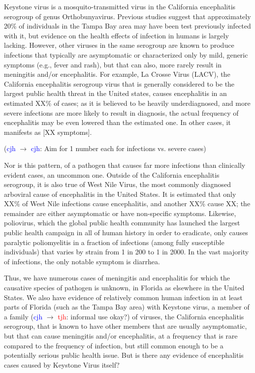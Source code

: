 \documentclass[12pt]{article}
\newcommand{\cjh}{\textcolor{blue}{cjh}}
\newcommand{\tjh}{\textcolor{red}{tjh}}
\newcommand{\msg}[3]{(#1 $\rightarrow$ #2: #3)}
\newcommand{\mcc}[1]{\msg\cjh\cjh{#1}}
\newcommand{\mct}[1]{\msg\cjh\tjh{#1}}
\begin{document}
        Keystone virus is a mosquito-transmitted virus in the California encephalitis serogroup of genus Orthobunyavirus. Previous studies suggest that approximately 20\% of individuals in the Tampa Bay area may have been test previously infected with it, but evidence on the health effects of infection in humans is largely lacking. However, other viruses in the same serogroup are known to produce infections that typically are asymptomatic or characterized only by mild, generic symptoms (e.g., fever and rash), but that can also, more rarely result in meningitis and/or encephalitis. For example, La Crosse Virus (LACV), the California encephalitis serogroup virus that is generally considered to be the largest public health threat in the United states, causes encephalitis in an estimated XX\% of cases; as it is believed to be heavily underdiagnosed, and more severe infections are more likely to result in diagnosis, the actual frequency of encephalitis may be even lowered than the estimated one. In other cases, it manifests as [XX symptoms].

        \mcc{Aim for 1 number each for infections vs. severe cases}

        Nor is this pattern, of a pathogen that causes far more infections than clinically evident cases, an uncommon one. Outside of the California encephalitis serogroup, it is also true of West Nile Virus, the most commonly diagnosed arboviral cause of encephalitis in the United States. It is estimated that only XX\% of West Nile infections cause encephalitis, and another XX\% cause XX; the remainder are either asymptomatic or have non-specific symptoms. Likewise, poliovirus, which the global public health community has launched the largest public health campaign in all of human history in order to eradicate, only causes paralytic poliomyelitis in a fraction of infections (among fully susceptible individuals) that varies by strain from 1 in 200 to 1 in 2000. In the vast majority of infections, the only notable symptom is diarrhea.

        Thus, we have numerous cases of meningitis and encephalitis for which the causative species of pathogen is unknown, in Florida as elsewhere in the United States. We also have evidence of relatively common human infection in at least parts of Florida (such as the Tampa Bay area) with Keystone virus, a member of a family \mct{informal use okay?} of viruses, the California encephalitis serogroup, that is known to have other members that are usually asymptomatic, but that can cause meningitis and/or encephalitis, at a frequency that is rare compared to the frequency of infection, but still common enough to be a potentially serious public health issue. But is there any evidence of encephalitis cases caused by Keystone Virus itself?
\end{document}

